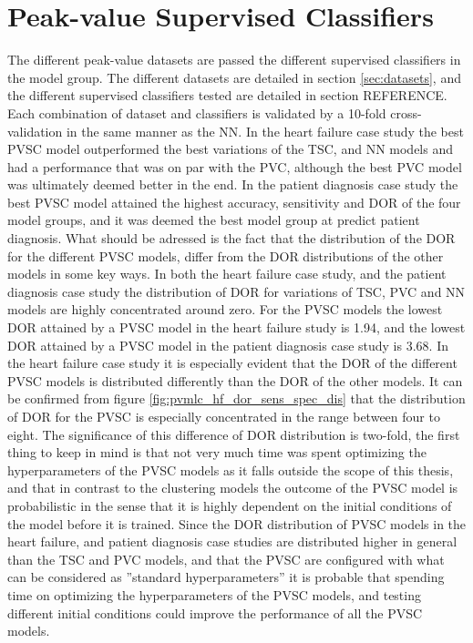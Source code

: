 \section{Peak-value Supervised Classifiers} \label{sec:disc_pvsc}

The different peak-value datasets are passed the different supervised classifiers in the model group. The different datasets are detailed in section \ref{sec:datasets}, and the different supervised classifiers tested are detailed in section REFERENCE. Each combination of dataset and classifiers is validated by a 10-fold cross-validation in the same manner as the NN. 
In the heart failure case study the best PVSC model outperformed the best variations of the TSC, and NN models and had a performance that was on par with the PVC, although the best PVC model was ultimately deemed better in the end. In the patient diagnosis case study the best PVSC model attained the highest accuracy, sensitivity and DOR of the four model groups, and it was deemed the best model group at predict patient diagnosis. 
What should be adressed is the fact that the distribution of the DOR for the different PVSC models, differ from the DOR distributions of the other models in some key ways. In both the heart failure case study, and the patient diagnosis case study the distribution of DOR for variations of TSC, PVC and NN models are highly concentrated around zero. For the PVSC models the lowest DOR attained by a PVSC model in the heart failure study is 1.94, and the lowest DOR attained by a PVSC model in the patient diagnosis case study is 3.68. In the heart failure case study it is especially evident that the DOR of the different PVSC models is distributed differently than the DOR of the other models. It can be confirmed from figure \ref{fig:pvmlc_hf_dor_sens_spec_dis} that the distribution of DOR for the PVSC is especially concentrated in the range between four to eight. The significance of this difference of DOR distribution is two-fold, the first thing to keep in mind is that not very much time was spent optimizing the hyperparameters of the PVSC models as it falls outside the scope of this thesis, and that in contrast to the clustering models the outcome of the PVSC model is probabilistic in the sense that it is highly dependent on the initial conditions of the model before it is trained. Since the DOR distribution of PVSC models in the heart failure, and patient diagnosis case studies are distributed higher in general than the TSC and PVC models, and that the PVSC are configured with what can be considered as ''standard hyperparameters'' it is probable that spending time on optimizing the hyperparameters of the PVSC models, and testing different initial conditions could improve the performance of all the PVSC models. 

